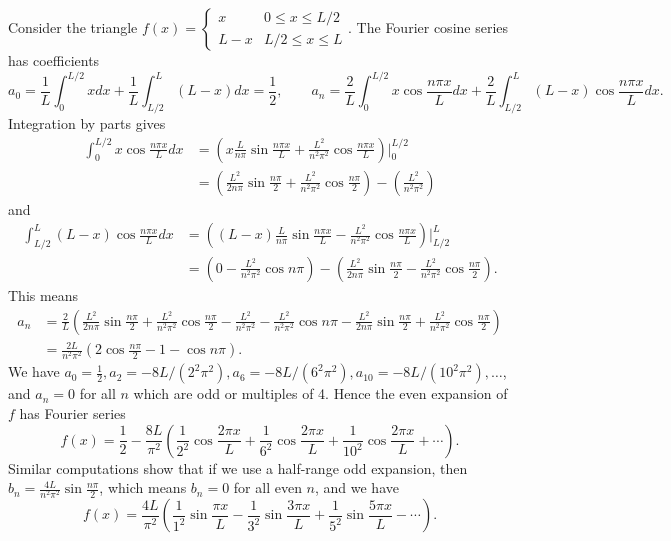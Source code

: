 Consider the triangle $f(x) = \begin{cases}x&0\leq x\leq L/2\\L-x&L/2\leq x\leq L\end{cases}$. The Fourier cosine series has coefficients 
$$a_0=\frac{1}{L}\int_0^{L/2} x dx+\frac{1}{L}\int_{L/2}^L (L-x) dx = \frac{1}{2},\quad\quad a_n=\frac{2}{L}\int_0^{L/2} x\cos \frac{n\pi x}{L}dx + \frac{2}{L}\int_{L/2}^L (L-x)\cos \frac{n\pi x}{L}dx.$$
Integration by parts gives 
\begin{align*}
\int_0^{L/2} x\cos \frac{n\pi x}{L}dx 
&= \left(x\frac{L}{n\pi}\sin\frac{n\pi x}{L} + \frac{L^2}{n^2\pi^2}\cos\frac{n\pi x}{L}\right)\bigg|_{0}^{L/2} \\
&= \left(\frac{L^2}{2n\pi}\sin\frac{n\pi }{2} + \frac{L^2}{n^2\pi^2}\cos\frac{n\pi }{2}\right) - \left(\frac{L^2}{n^2\pi^2}\right)
\end{align*}
and
\begin{align*}
\int_{L/2}^L (L-x)\cos \frac{n\pi x}{L}dx 
&= \left((L-x)\frac{L}{n\pi}\sin\frac{n\pi x}{L} - \frac{L^2}{n^2\pi^2}\cos\frac{n\pi x}{L}\right)\bigg|_{L/2}^L \\
&= \left( 0-\frac{L^2}{n^2\pi^2}\cos n\pi \right) 
- \left(\frac{L^2}{2n\pi}\sin\frac{n\pi}{2} - \frac{L^2}{n^2\pi^2}\cos\frac{n\pi }{2}\right).
\end{align*}
This means 
\begin{align*}
a_n 
&= \frac{2}{L}\left(\frac{L^2}{2n\pi}\sin\frac{n\pi }{2} + \frac{L^2}{n^2\pi^2}\cos\frac{n\pi }{2} - \frac{L^2}{n^2\pi^2} -\frac{L^2}{n^2\pi^2}\cos n\pi  
- \frac{L^2}{2n\pi}\sin\frac{n\pi }{2} + \frac{L^2}{n^2\pi^2}\cos\frac{n\pi }{2}\right) \\
&= \frac{2L}{n^2\pi^2}\left(2\cos\frac{n\pi }{2} -1 - \cos n\pi \right).
\end{align*}
We have $a_0=\frac{1}{2}, a_2=-8L/(2^2\pi^2), a_6= -8L/(6^2\pi^2), a_{10}=-8L/(10^2\pi^2) ,\ldots$, and $a_n=0$ for all $n$ which are odd or multiples of 4.   Hence the even expansion of $f$ has Fourier series 
$$f(x) = \frac{1}{2} -\frac{8L}{\pi^2}\left( \frac{1}{2^2}\cos \frac{2\pi x}{L} +  \frac{1}{6^2}\cos \frac{2\pi x}{L}+  \frac{1}{10^2}\cos \frac{2\pi x}{L}+\cdots\right).$$
Similar computations show that if we use a half-range odd expansion, then $b_n = \frac{4L}{n^2\pi^2}\sin\frac{n\pi}{2}$, which means $b_n = 0$ for all even $n$, and we have 
$$f(x) = \frac{4L}{\pi^2}\left( \frac{1}{1^2}\sin \frac{\pi x}{L} -  \frac{1}{3^2}\sin \frac{3\pi x}{L}+  \frac{1}{5^2}\sin \frac{5\pi x}{L}-\cdots\right).$$

